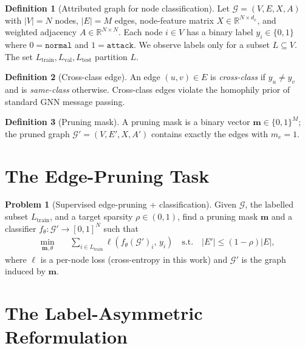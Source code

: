 \documentclass[11pt,a4paper]{report}
\theoremstyle{definition}
\newtheorem{definition}{Definition}[chapter]
\newtheorem{problem}{Problem}[chapter]
\theoremstyle{remark}
\begin{document}
\begin{definition}[Attributed graph for node classification]
Let $\mathcal{G}=(V,E,X,A)$ with $|V|=N$ nodes, $|E|=M$ edges, node-feature
matrix $X\in\mathbb{R}^{N\times d_x}$, and weighted adjacency
$A\in\mathbb{R}^{N\times N}$. Each node $i\in V$ has a binary label
$y_i\in\{0,1\}$ where $0=\texttt{normal}$ and $1=\texttt{attack}$. We
observe labels only for a subset $L\subseteq V$. The set
$L_{\text{train}}, L_{\text{val}}, L_{\text{test}}$ partition $L$.
\end{definition}

\begin{definition}[Cross-class edge]
An edge $(u,v)\in E$ is \emph{cross-class} if $y_u\ne y_v$ and is
\emph{same-class} otherwise. Cross-class edges violate the homophily
prior of standard GNN message passing.
\end{definition}

\begin{definition}[Pruning mask]
A pruning mask is a binary vector $\bm{m}\in\{0,1\}^M$; the pruned graph
$\mathcal{G}'=(V,E',X,A')$ contains exactly the edges with $m_e=1$.
\end{definition}

\section{The Edge-Pruning Task}

\begin{problem}[Supervised edge-pruning + classification]
\label{prob:joint}
Given $\mathcal{G}$, the labelled subset $L_{\text{train}}$, and a target
sparsity $\rho\in(0,1)$, find a pruning mask $\bm{m}$ and a classifier
$f_\theta:\mathcal{G}'\to[0,1]^N$ such that
\begin{align}
\min_{\bm{m},\theta}\quad &
\sum_{i\in L_{\text{train}}}
   \ell\!\left(f_\theta(\mathcal{G}')_i,\, y_i\right)
\quad \text{s.t.}\quad |E'|\le (1-\rho)|E|,
\end{align}
where $\ell$ is a per-node loss (cross-entropy in this work) and
$\mathcal{G}'$ is the graph induced by $\bm{m}$.
\end{problem}

\section{The Label-Asymmetric Reformulation}
\end{document}
